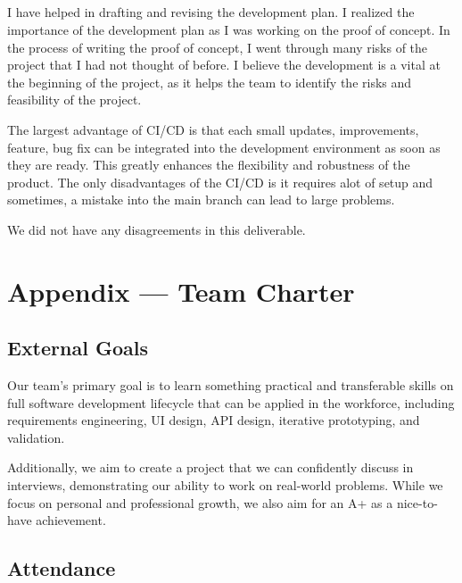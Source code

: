 \documentclass{article}
\begin{document}
\subsection{\color{blue}{Shike Chen}}

I have helped in drafting and revising the development plan. I realized the 
importance of the development plan as I was working on the proof of concept.
In the process of writing the proof of concept, I went through many risks of
the project that I had not thought of before. I believe the development is a
vital at the beginning of the project, as it helps the team to identify the
risks and feasibility of the project.

The largest advantage of CI/CD is that each small updates, improvements, 
feature, bug fix can be integrated into the development environment as soon as 
they are ready. This greatly enhances the flexibility and robustness of the 
product. The only disadvantages of the CI/CD is it requires alot of setup and 
sometimes, a mistake into the main branch can lead to large problems.

We did not have any disagreements in this deliverable.

\newpage{}
\section*{Appendix --- Team Charter}


\subsection*{External Goals}

Our team's primary goal is to learn something practical and transferable skills
on full software development lifecycle that can be applied in the workforce,
including requirements engineering, UI design, API design, iterative
prototyping, and validation.

Additionally, we aim to create a project that we can confidently discuss in
interviews, demonstrating our ability to work on real-world problems. While we
focus on personal and professional growth, we also aim for an A+ as a
nice-to-have achievement.

\subsection*{Attendance}
\end{document}
